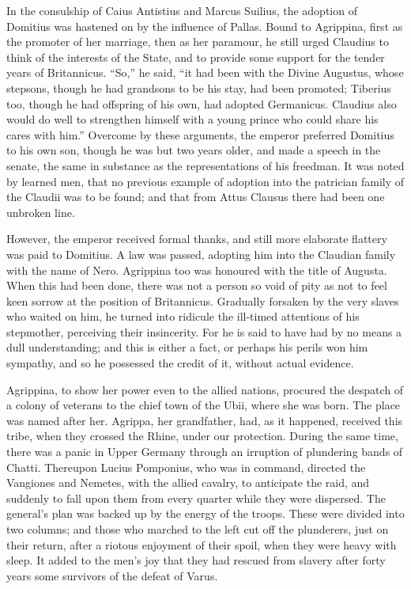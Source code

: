 
In the consulship of Caius Antistius and Marcus Suilius, the adoption of Domitius was hastened on by the influence of Pallas. Bound to Agrippina, first as the promoter of her marriage, then as her paramour, he still urged Claudius to think of the interests of the State, and to provide some support for the tender years of Britannicus. ``So,'' he said, ``it had been with the Divine Augustus, whose stepsons, though he had grandsons to be his stay, had been promoted; Tiberius too, though he had offspring of his own, had adopted Germanicus. Claudius also would do well to strengthen himself with a young prince who could share his cares with him.'' Overcome by these arguments, the emperor preferred Domitius to his own son, though he was but two years older, and made a speech in the senate, the same in substance as the representations of his freedman. It was noted by learned men, that no previous example of adoption into the patrician family of the Claudii was to be found; and that from Attus Clausus there had been one unbroken line.


However, the emperor received formal thanks, and still more elaborate flattery was paid to Domitius. A law was passed, adopting him into the Claudian family with the name of Nero. Agrippina too was honoured with the title of Augusta. When this had been done, there was not a person so void of pity as not to feel keen sorrow at the position of Britannicus. Gradually forsaken by the very slaves who waited on him, he turned into ridicule the ill-timed attentions of his stepmother, perceiving their insincerity. For he is said to have had by no means a dull understanding; and this is either a fact, or perhaps his perils won him sympathy, and so he possessed the credit of it, without actual evidence.


Agrippina, to show her power even to the allied nations, procured the despatch of a colony of veterans to the chief town of the Ubii, where she was born. The place was named after her. Agrippa, her grandfather, had, as it happened, received this tribe, when they crossed the Rhine, under our protection. During the same time, there was a panic in Upper Germany through an irruption of plundering bands of Chatti. Thereupon Lucius Pomponius, who was in command, directed the Vangiones and Nemetes, with the allied cavalry, to anticipate the raid, and suddenly to fall upon them from every quarter while they were dispersed. The general's plan was backed up by the energy of the troops. These were divided into two columns; and those who marched to the left cut off the plunderers, just on their return, after a riotous enjoyment of their spoil, when they were heavy with sleep. It added to the men's joy that they had rescued from slavery after forty years some survivors of the defeat of Varus.


